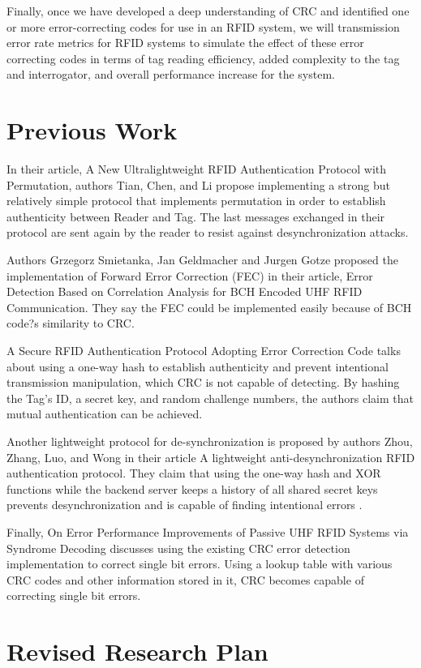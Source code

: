 \documentclass{sigcomm-alternate}
\begin{document}
Finally, once we have developed a deep understanding of CRC and identified one or more error-correcting codes for use in an RFID system, we will transmission error rate metrics for RFID systems to simulate the effect of these error correcting codes in terms of tag reading efficiency, added complexity to the tag and interrogator, and overall performance increase for the system.

\section{Previous Work}
In their article, A New Ultralightweight RFID Authentication Protocol with Permutation, authors Tian, Chen, and Li propose implementing a strong but relatively simple protocol that implements permutation in order to establish authenticity between Reader and Tag\cite{3}. The last messages exchanged in their protocol are sent again by the reader to resist against desynchronization attacks.

Authors Grzegorz Smietanka, Jan Geldmacher and Jurgen Gotze proposed the implementation of Forward Error Correction (FEC) in their article, Error Detection Based on Correlation Analysis for BCH Encoded UHF RFID Communication\cite{1}. They say the FEC could be implemented easily because of BCH code?s similarity to CRC. 

A Secure RFID Authentication Protocol Adopting Error Correction Code talks about using a one-way hash to establish authenticity and prevent intentional transmission manipulation, which CRC is not capable of detecting. By hashing the Tag's ID, a secret key, and random challenge numbers, the authors claim that mutual authentication can be achieved\cite{5}.

Another lightweight protocol for de-synchronization is proposed by authors Zhou, Zhang, Luo, and Wong in their article A lightweight anti-desynchronization RFID authentication protocol. They claim that using the one-way hash and XOR functions while the backend server keeps a history of all shared secret keys prevents desynchronization and is capable of finding intentional errors \cite{4}.

Finally, On Error Performance Improvements of Passive UHF RFID Systems via Syndrome Decoding discusses using the existing CRC error detection implementation to correct single bit errors. Using a lookup table with various CRC codes and other information stored in it, CRC becomes capable of correcting single bit errors\cite{2}.

\section{Revised Research Plan}
\end{document}

